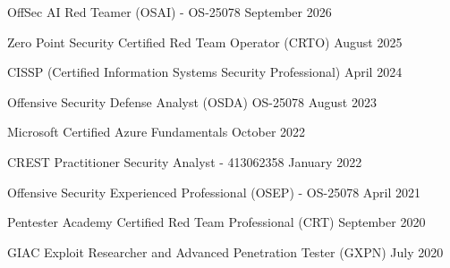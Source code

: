 




\begin{cvhonors}

 \cvhonor
    {} %
    {OffSec AI Red Teamer (OSAI) - OS‑25078} %
    {} %
    {September 2026} %

 \cvhonor
    {} %
    {Zero Point Security Certified Red Team Operator (CRTO)} %
    {} %
    {August 2025} %



  \cvhonor
    {} %
    {CISSP (Certified Information Systems Security Professional)} %
    {} %
    {April 2024} %

  \cvhonor
    {} %
    {Offensive Security Defense Analyst (OSDA) OS-25078} %
    {} %
    {August 2023} %

  \cvhonor
    {} %
    {Microsoft Certified Azure Fundamentals} %
    {} %
    {October 2022} %

      \cvhonor
    {} %
    {CREST Practitioner Security Analyst - 413062358} %
    {} %
    {January 2022} %

      \cvhonor
    {} %
    {Offensive Security Experienced Professional (OSEP) - OS-25078} %
    {} %
    {April 2021} %

  \cvhonor
    {} %
    {Pentester Academy Certified Red Team Professional (CRT)} %
    {} %
    {September 2020} %

          \cvhonor
    {} %
    {GIAC Exploit Researcher and Advanced Penetration Tester (GXPN)} %
    {} %
    {July 2020} %


\end{cvhonors}
